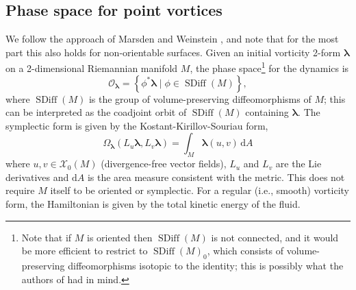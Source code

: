 \documentclass[11pt,twoside]{article}
\theoremstyle{definition}
\newtheorem{rem}[theorem]{Remark}
\numberwithin{equation}{section}
\def\Mt{\widetilde{M}}
\def\SDiff{{\mathop\mathrm{SDiff}\nolimits}}
\def\blambda{{\boldsymbol\lambda}}
\def\d{\mathrm{d}}
\begin{document}
 
%
% 




\subsection{Phase space for point vortices}
We follow the approach of Marsden and Weinstein  \cite{Marsden-Weinstein-Vortices}, and note that for the most part this also holds for non-orientable surfaces. 
Given an initial vorticity 2-form $\blambda$ on a 2-dimensional Riemannian manifold $M$, the phase space\footnote{Note that if $M$ is oriented then $\SDiff(M)$ is not connected, and it would be more efficient to restrict to $\SDiff(M)_0$, which consists of volume-preserving diffeomorphisms isotopic to the identity; this is possibly what the authors of \cite{Marsden-Weinstein-Vortices} had in mind.} for the dynamics is 
$$\mathcal{O}_\blambda = \left\{\phi^*\blambda \mid \phi\in\SDiff(M)\right\},$$
where $\SDiff(M)$ is the group of volume-preserving diffeomorphisms of $M$; this can be interpreted as the coadjoint orbit of $\SDiff(M)$ containing $\blambda$. The symplectic form is given by the Kostant-Kirillov-Souriau form,
$$\Omega_\blambda(L_u\blambda,L_v\blambda) = \int_M\blambda(u,v)\,\d A$$
where $u,v\in\mathcal{X}_0(M)$ (divergence-free vector fields), $L_u$ and $L_v$ are the Lie derivatives and $\d A$ is the area measure consistent with the metric. This does not require $M$ itself to be oriented or symplectic.  For a regular (i.e., smooth) vorticity form, the Hamiltonian is given by the total kinetic energy of the fluid. 
\end{document}
